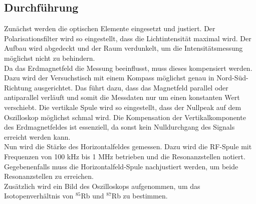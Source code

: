 \subsection{Durchführung}
\label{subsec:Durchführung}
Zunächst werden die optischen Elemente eingesetzt und justiert. Der Polarisationsfilter wird so eingestellt, dass die Lichtintensität maximal wird.
Der Aufbau wird abgedeckt und der Raum verdunkelt, um die Intensitätsmessung möglichst nicht zu behindern.\\
Da das Erdmagnetfeld die Messung beeinflusst,
muss dieses kompensiert werden. Dazu wird der Versuchstisch mit einem Kompass möglichst genau in Nord-Süd-Richtung ausgerichtet. Das führt dazu, dass das Magnetfeld parallel oder antiparallel
verläuft und somit die Messdaten nur um einen konstanten Wert verschiebt. Die vertikale Spule wird so eingestellt, dass der Nullpeak auf dem Oszilloskop möglichst schmal wird. 
Die Kompensation der Vertikalkomponente des Erdmagnetfeldes ist essenziell, da sonst kein Nulldurchgang des Signals erreicht werden kann.\\
Nun wird die Stärke des Horizontalfeldes gemessen. Dazu wird die RF-Spule mit Frequenzen von 100 kHz bis 1 MHz betrieben und die Resonanzstellen notiert. Gegebenenfalls muss die Horizontalfeld-Spule
nachjustiert werden, um beide Resonanzstellen zu erreichen.\\
Zusätzlich wird ein Bild des Oszilloskops aufgenommen, um das Isotopenverhältnis von $^{85}$Rb und $^{87}$Rb zu bestimmen.

\newpage
